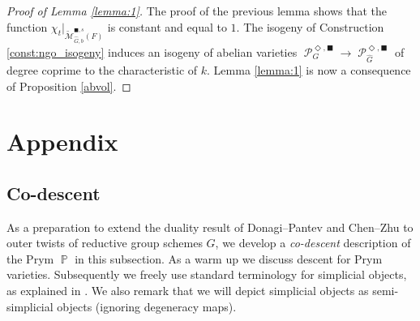 \documentclass{article}
\DeclareMathOperator{\Pb}{\mathbb{P}}
\DeclareMathOperator{\Aut}{\mathsf{Aut}}
\newcommand{\Mc}{\mathcal{M}}
\DeclareMathOperator{\Pc}{\mathcal{P}}
\DeclareMathOperator{\vol}{\mathsf{vol}}
\theoremstyle{definition}
\theoremstyle{plain}
\begin{document}
\begin{proof}[Proof of Lemma \ref{lemma:1}]
The proof of the previous lemma shows that the function $\chi_t|_{\widetilde{\Mc}^{\blacksquare,s}_{\widehat{G},b}(F)}$ is constant and equal to $1$.
The isogeny of Construction \ref{const:ngo_isogeny} induces an isogeny of abelian varieties $\Pc_G^{\Diamond,\blacksquare} \to \Pc_{\widehat{G}}^{\Diamond,\blacksquare}$ of degree coprime to the characteristic of $k$. Lemma \ref{lemma:1} is now a consequence of Proposition \ref{abvol}. 
\end{proof}



\appendix

\section{Appendix}

\subsection{Co-descent}

As a preparation to extend the duality result of Donagi--Pantev and Chen--Zhu to outer twists of reductive group schemes $G$, we develop a \emph{co-descent} description of the Prym $\Pb$ in this subsection. As a warm up we discuss descent for Prym varieties. Subsequently we freely use standard terminology for simplicial objects, as explained in \cite[Tag 0169]{stacks-project}. We also remark that we will depict simplicial objects as semi-simplicial objects (ignoring degeneracy maps). 
\end{document}
